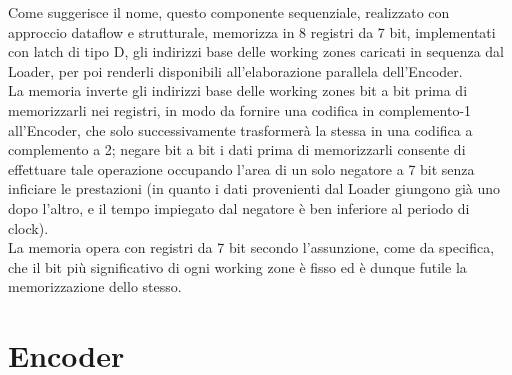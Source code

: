 \documentclass[10pt,english, openany]{book}
\begin{document}
Come suggerisce il nome, questo componente sequenziale, realizzato con approccio dataflow e strutturale, memorizza in 8 registri da 7 bit, implementati con latch di tipo D, gli indirizzi base delle working zones caricati in sequenza dal Loader, per poi renderli disponibili all’elaborazione parallela dell’Encoder.\\
La memoria inverte gli indirizzi base delle working zones bit a bit prima di memorizzarli nei registri, in modo da fornire una codifica in complemento-1 all’Encoder, che solo successivamente trasformerà la stessa in una codifica a complemento a 2; negare bit a bit i dati prima di memorizzarli consente di effettuare tale operazione occupando l’area di un solo negatore a 7 bit senza inficiare le prestazioni (in quanto i dati provenienti dal Loader giungono già uno dopo l’altro, e il tempo impiegato dal negatore è ben inferiore al periodo di clock).\\
La memoria opera con registri da 7 bit secondo l’assunzione, come da specifica, che il bit più significativo di ogni working zone è fisso ed è dunque futile la memorizzazione dello stesso.

\section{Encoder}
\end{document}
